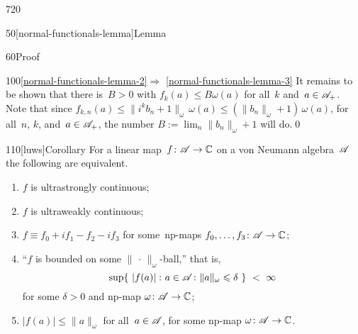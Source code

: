 \begin{parsec}{720}
\begin{point}{50}[normal-functionals-lemma]{Lemma}
\begin{point}{60}{Proof}
\begin{point}{100}{\ref{normal-functionals-lemma-2}$\Longrightarrow$%
\ref{normal-functionals-lemma-3}}
It remains to be shown that there is~$B>0$ with $f_k(a)\leq B\omega(a)$
for all~$k$ and~$a\in\mathscr{A}_{+}$.
Note that since $f_{k,n}(a) \leq \|i^kb_n+1\|_\omega \,\omega(a)
\leq (\|b_n\|_\omega+1) \,\omega(a)$,
for all~$n$, $k$, and~$a\in\mathscr{A}_{+}$,
the number $B:=\lim_n \|b_n\|_\omega +1 $ will do.\qed
\end{point}
\end{point}
\end{point}
\begin{point}{110}[luws]{Corollary}%
For a linear map~$f\colon \mathscr{A}\to \mathbb{C}$
on a von Neumann algebra~$\mathscr{A}$ the following are equivalent.
\begin{enumerate}
\item
$f$ is ultrastrongly continuous;
\item
$f$ is ultraweakly continuous;
\item
$f\equiv f_0+if_1-f_2-if_3$
for some~np-maps $f_0,\dotsc,f_3\colon \mathscr{A}\to\mathbb{C}$;
\item
``$f$ is bounded on some $\|\,\cdot\,\|_\omega$-ball,''
that is,
\begin{equation*}
	\sup\{\ \left|f(a)\right|\colon a\in \mathscr{A}\colon 
		\|a\|_\omega\leqslant \delta\ \}\ <\ \infty
\end{equation*}
for some $\delta>0$ and  np-map $\omega\colon \mathscr{A}\to\mathbb{C}$;
\item
$\left|f(a)\right|\leq \|a\|_\omega$
for all~$a\in \mathscr{A}$, for some np-map $\omega\colon \mathscr{A}\to\mathbb{C}$.
\end{enumerate}
\spacingfix%
\end{point}%
\end{parsec}%
%
%
